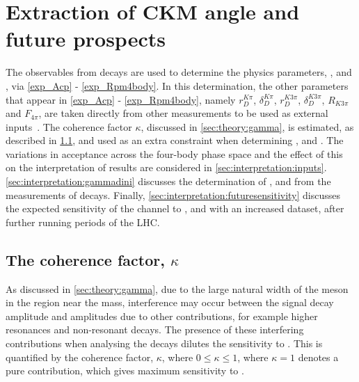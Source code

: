 \clearpage
%

\chapter{\label{ch:6-interpretation}Extraction of CKM angle \Pgamma and future prospects} 


The \CP observables from \btodkst decays are used to determine the physics parameters, \rb, \deltab and \Pgamma, via \eqns\ref{exp_Acp} - \ref{exp_Rpm4body}. In this determination, the other parameters that appear in \eqns\ref{exp_Acp} - \ref{exp_Rpm4body}, namely $r_D^{K\pi}$, $\delta_D^{K\pi}$, $r_D^{K3\pi}$, $\delta_D^{K3\pi}$, $R_{K3\pi}$ and $F_{4\pi}$, are taken directly from other measurements to be used as external inputs~\cite{HFAG,charmk3pi,charmk3pi_errata,charm4pi}. The coherence factor $\kappa$, discussed in \sect\ref{sec:theory:gamma}, is estimated, as described in \sect\ref{sec:interpretation:coherence}, and used as an extra constraint when determining \rb, \deltab and \Pgamma. The variations in acceptance across the four-body phase space and the effect of this on the interpretation of results are considered in \sect\ref{sec:interpretation:inputs}. \Sect\ref{sec:interpretation:gammadini} discusses the determination of \rb, \deltab and \Pgamma from the measurements of \btodkst decays. Finally, \sect\ref{sec:interpretation:futuresensitivity} discusses the expected sensitivity of the \btodkst channel to \rb, \deltab and \Pgamma with an increased dataset, after further running periods of the LHC.

\section{The coherence factor, $\kappa$}
\label{sec:interpretation:coherence}

As discussed in \sect\ref{sec:theory:gamma}, due to the large natural width of the \Kstarm meson in the region near the \Kstarm mass, interference may occur between the signal \Kstarm decay amplitude and amplitudes due to other \decay{\Bm}{\D\KS\pim} contributions, for example higher \KS\pim resonances and non-resonant decays. The presence of these interfering contributions when analysing the \btodkst decays dilutes the sensitivity to \Pgamma. This is quantified by the coherence factor, $\kappa$, where $0 \leq \kappa \leq 1$, where $\kappa = 1$ denotes a pure \Kstarm contribution, which gives maximum sensitivity to \Pgamma. 

